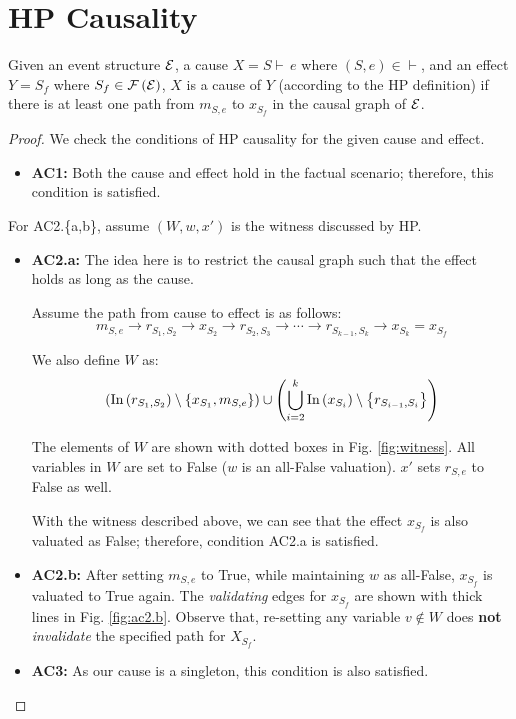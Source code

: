 \section{HP Causality}

\begin{thm}
Given an event structure $\mathcal{E}$, a cause $X = S \vdash\,e$
where $(S, e) \in \vdash$, and an effect $Y = S_f$
where $S_f \in \mathcal{F} \left( \mathcal{E} \right)$, $X$ is a cause of $Y$
(according to the HP definition) if there is at least one path
from $m_{S,e}$ to $x_{S_f}$ in the causal graph of $\mathcal{E}$.
\end{thm}

\begin{proof}
We check the conditions of HP causality for the given cause and effect.

\begin{itemize}
  \item \textbf{AC1:} Both the cause and effect hold in the factual scenario;
  therefore, this condition is satisfied.
\end{itemize}

For AC2.\{a,b\}, assume $(W, w, x')$ is the witness discussed by HP.

\begin{itemize}  
  \item \textbf{AC2.a:} The idea here is to restrict the causal graph
  such that the effect holds as long as the cause.
  
  Assume the path from cause to effect is as follows:
  \[
    m_{S,e} \rightarrow
    r_{S_1,S_2} \rightarrow
    x_{S_2} \rightarrow
    r_{S_2, S_3} \rightarrow
    \cdots \rightarrow
    r_{S_{k-1}, S_k} \rightarrow x_{S_k} = x_{S_f}
  \]

  We also define $W$ as:
  \[ \left( \text{In} \left( r_{S_1, S_2} \right) \setminus \left\{ x_{S_1}, m_{S,e} \right\} \right) \cup
    \left( \bigcup_{i=2}^k \text{In} \left( x_{S_i} \right) \setminus \left\{ r_{S_{i-1}, S_i} \right\} \right) \]
   
  The elements of $W$ are shown with dotted boxes in Fig. \ref{fig:witness}.
  All variables in $W$ are set to False ($w$ is an all-False valuation).
  $x'$ sets $r_{S,e}$ to False as well.
  
  

  With the witness described above, we can see that the effect $x_{S_f}$
  is also valuated as False; therefore, condition AC2.a is satisfied.
  
  
  \item \textbf{AC2.b:} After setting $m_{S,e}$ to True,
  while maintaining $w$ as all-False, $x_{S_f}$ is valuated to True again.
  The \textit{validating} edges for $x_{S_f}$ are shown with thick lines
  in Fig. \ref{fig:ac2.b}. Observe that, re-setting any variable $v \not\in W$
  does \textbf{not} \textit{invalidate} the specified path for $X_{S_f}$.

  

  \item \textbf{AC3:} As our cause is a singleton,
  this condition is also satisfied.
\end{itemize}

\end{proof}